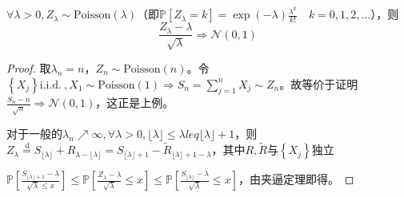 \documentclass{ctexart}
\begin{document}
\begin{Eg}
  $\forall\lambda>0, Z_{\lambda}\sim \mathrm{Poisson}(\lambda)$（即$\mathbb{P}\left[ Z_{\lambda}=k \right]= \exp(-\lambda)\frac{\lambda^k}{k!} \quad k=0,1,2,\dots$），则
  \[\frac{Z_{\lambda}-\lambda}{\sqrt{\lambda}}\Rightarrow \mathcal{N}(0,1)\]

  \begin{proof}
    取$\lambda_n=n$，$Z_n\sim \mathrm{Poisson}(n)$。令$\left\{ X_j \right\} \mathrm{i.i.d.}~, X_1 \sim \mathrm{Poisson}(1)\Rightarrow S_n=\sum\limits_{j=1}^nX_j\sim Z_n$。故等价于证明$\frac{S_n-n}{\sqrt{n}}\Rightarrow \mathcal{N}(0,1)$，这正是上例。

    对于一般的$\lambda_n\nearrow \infty, \forall \lambda>0, \lfloor \lambda \rfloor\leq \lambda leq \lfloor \lambda \rfloor+1$，则$Z_{\lambda} \stackrel{\,\mathrm{d}}{=}S_{\lfloor \lambda \rfloor}+R_{\lambda-\lfloor \lambda \rfloor}=S_{\lfloor \lambda \rfloor+1}-\tilde{R}_{\lfloor \lambda \rfloor+1- \lambda} $，其中$R,\tilde{R}$与$\left\{ X_j \right\}$独立

$\mathbb{P}\left[ \frac{S_{\lfloor \lambda \rfloor+1}-\lambda}{\sqrt{\lambda}\leq x} \right]\leq\mathbb{P}\left[ \frac{Z_{\lambda}-\lambda}{\sqrt{\lambda}}\leq x \right]\leq \mathbb{P}\left[ \frac{S_{\lfloor \lambda \rfloor}-\lambda}{\sqrt{\lambda}}\leq x \right]$，由夹逼定理即得。


  \end{proof}
  
\end{Eg}













\ifx\allfiles\undefined
\end{document}
